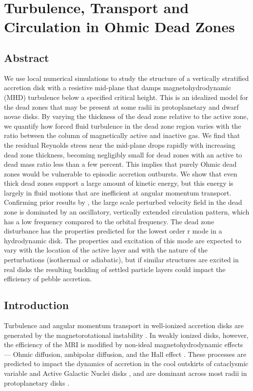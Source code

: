 \chapter{Turbulence, Transport and Circulation in Ohmic Dead Zones}
\label{odz}


\section{Abstract} 
We use local numerical simulations to study the structure of a vertically stratified accretion disk with a resistive mid-plane that damps magnetohydrodynamic (MHD) turbulence below a specified critical height. This is an idealized model for the dead zones that may be present at some radii in protoplanetary and dwarf novae disks. By varying the thickness of the dead zone relative to the active zone, we quantify how forced fluid turbulence in the dead zone region varies with the ratio between the column of magnetically active and inactive gas. We find that the residual Reynolds stress near the mid-plane drops rapidly with increasing dead zone thickness, becoming negligibly small for dead zones with an active to dead mass ratio less than a few percent. This implies that purely Ohmic dead zones would be vulnerable to episodic accretion outbursts. We show that even thick dead zones support a large amount of kinetic energy, but this energy is largely in fluid motions that are inefficient at angular momentum transport. Confirming prior results by \cite{oishi09}, the large scale perturbed velocity field in the dead zone is dominated by an oscillatory, vertically extended circulation pattern, which has a low frequency compared to the orbital frequency. The dead zone disturbance has the properties predicted for the lowest order r mode in a hydrodynamic disk. The properties and excitation of this mode are expected to vary with the location of the active layer and with the nature of the perturbations (isothermal or adiabatic), but if similar structures are excited in real disks the resulting buckling of settled particle layers could impact the efficiency of pebble accretion.  





\section{Introduction} 
Turbulence and angular momentum transport in well-ionized accretion disks are generated by the 
magnetorotational instability \citep[MRI;][]{balbus91,balbus98}. In weakly ionized disks, however, 
the efficiency of the MRI is modified by non-ideal magnetohydrodynamic effects --- Ohmic diffusion, 
ambipolar diffusion, and the Hall effect \citep{blaes94}. These processes are predicted to impact the dynamics 
of accretion in the cool outskirts of cataclysmic variable \citep{gammie98} and Active Galactic 
Nuclei disks \citep{menou01}, and are dominant across most radii in protoplanetary disks 
\citep[for reviews, see e.g.][]{armitage11,turner14}.

